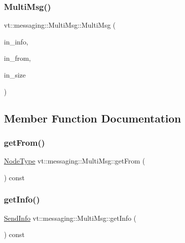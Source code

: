 \subsubsection{\texorpdfstring{Multi\+Msg()}{MultiMsg()}\hspace{0.1cm}{\footnotesize\ttfamily [2/2]}}
{\footnotesize\ttfamily vt\+::messaging\+::\+Multi\+Msg\+::\+Multi\+Msg (\begin{DoxyParamCaption}\item[{\hyperlink{structvt_1_1messaging_1_1_send_info}{Send\+Info}}]{in\+\_\+info,  }\item[{\hyperlink{namespacevt_a866da9d0efc19c0a1ce79e9e492f47e2}{Node\+Type}}]{in\+\_\+from,  }\item[{\hyperlink{namespacevt_a408e86a8c7c89309b52907dc5a513924}{Msg\+Size\+Type}}]{in\+\_\+size }\end{DoxyParamCaption})\hspace{0.3cm}{\ttfamily [inline]}}



\subsection{Member Function Documentation}
\mbox{\label{structvt_1_1messaging_1_1_multi_msg_aafefb2ed9f0321e9c4b746a3168eec8c}} 
\subsubsection{\texorpdfstring{get\+From()}{getFrom()}}
{\footnotesize\ttfamily \hyperlink{namespacevt_a866da9d0efc19c0a1ce79e9e492f47e2}{Node\+Type} vt\+::messaging\+::\+Multi\+Msg\+::get\+From (\begin{DoxyParamCaption}{ }\end{DoxyParamCaption}) const\hspace{0.3cm}{\ttfamily [inline]}}

\mbox{\label{structvt_1_1messaging_1_1_multi_msg_a199e909c6fe0ad3dac7a9204311c3e58}} 
\subsubsection{\texorpdfstring{get\+Info()}{getInfo()}}
{\footnotesize\ttfamily \hyperlink{structvt_1_1messaging_1_1_send_info}{Send\+Info} vt\+::messaging\+::\+Multi\+Msg\+::get\+Info (\begin{DoxyParamCaption}{ }\end{DoxyParamCaption}) const\hspace{0.3cm}{\ttfamily [inline]}}

